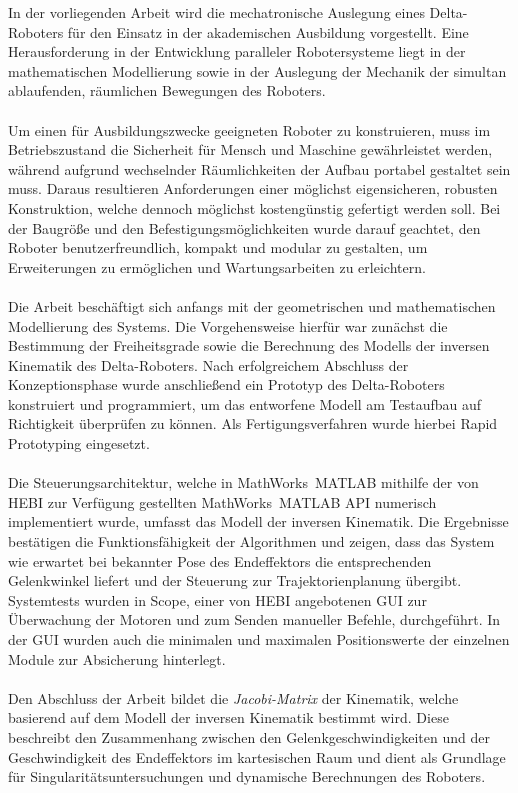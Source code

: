 \documentclass[Bachelor, BMR, ngerman]{twbook}
\begin{document}
    In der vorliegenden Arbeit wird die mechatronische Auslegung eines Delta-Roboters für den Einsatz in der akademischen Ausbildung vorgestellt. Eine Herausforderung in der Entwicklung paralleler Robotersysteme liegt in der mathematischen Modellierung sowie in der Auslegung der Mechanik der simultan ablaufenden, räumlichen Bewegungen des Roboters.\\ 
    \\
    Um einen für Ausbildungszwecke geeigneten Roboter zu konstruieren, muss im Betriebszustand die Sicherheit für Mensch und Maschine gewährleistet werden, während aufgrund wechselnder Räumlichkeiten der Aufbau portabel gestaltet sein muss. Daraus resultieren Anforderungen einer möglichst eigensicheren, robusten Konstruktion, welche dennoch möglichst kostengünstig gefertigt werden soll. Bei der Baugröße und den Befestigungsmöglichkeiten wurde darauf geachtet, den Roboter benutzerfreundlich, kompakt und modular zu gestalten, um Erweiterungen zu ermöglichen und Wartungsarbeiten zu erleichtern.\\
    \\
    Die Arbeit beschäftigt sich anfangs mit der geometrischen und mathematischen Modellierung des Systems. Die Vorgehensweise hierfür war zunächst die Bestimmung der Freiheitsgrade sowie die Berechnung des Modells der inversen Kinematik des Delta-Roboters. Nach erfolgreichem Abschluss der Konzeptionsphase wurde anschließend ein Prototyp des Delta-Roboters konstruiert und programmiert, um das entworfene Modell am Testaufbau auf Richtigkeit überprüfen zu können. Als Fertigungsverfahren wurde hierbei Rapid Prototyping eingesetzt.\\ 
    \\
    Die Steuerungsarchitektur, welche in MathWorks\textregistered\ MATLAB mithilfe der von HEBI zur Verfügung gestellten MathWorks\textregistered\ MATLAB API numerisch implementiert wurde, umfasst das Modell der inversen Kinematik. Die Ergebnisse bestätigen die Funktionsfähigkeit der Algorithmen und zeigen, dass das System wie erwartet bei bekannter Pose des Endeffektors die entsprechenden Gelenkwinkel liefert und der Steuerung zur Trajektorienplanung übergibt. Systemtests wurden in Scope, einer von HEBI angebotenen GUI zur Überwachung der Motoren und zum Senden manueller Befehle, durchgeführt. In der GUI wurden auch die minimalen und maximalen Positionswerte der einzelnen Module zur Absicherung hinterlegt.\\
    \\
    Den Abschluss der Arbeit bildet die \textit{Jacobi-Matrix} der Kinematik, welche basierend auf dem Modell der inversen Kinematik bestimmt wird. Diese beschreibt den Zusammenhang zwischen den Gelenkgeschwindigkeiten und der Geschwindigkeit des Endeffektors im kartesischen Raum und dient als Grundlage für Singularitätsuntersuchungen und dynamische Berechnungen des Roboters.\\
\end{document}
